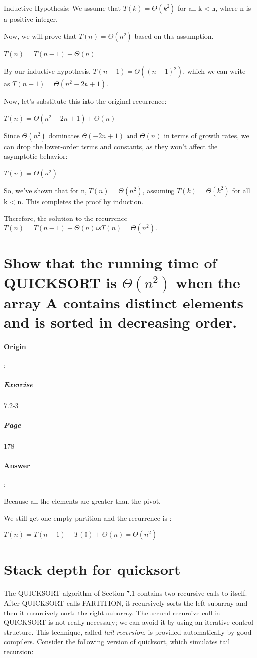 \documentclass{article}
\begin{document}
Inductive Hypothesis: We assume that $T(k) = \Theta(k^2)$ for all k < n, where n is a positive integer.

Now, we will prove that $T(n) = \Theta(n^2)$ based on this assumption.

$T(n) = T(n - 1) + \Theta(n)$

By our inductive hypothesis, $T(n - 1) = \Theta((n - 1)^2)$, which we can write as $T(n - 1) = \Theta(n^2 - 2n + 1)$.

Now, let's substitute this into the original recurrence:

$T(n) = \Theta(n^2 - 2n + 1) + \Theta(n)$

Since $\Theta(n^2)$ dominates $\Theta(-2n + 1)$ and $\Theta(n)$ in terms of growth rates, we can drop the lower-order terms and constants, as they won't affect the asymptotic behavior:

$T(n) = \Theta(n^2)$

So, we've shown that for n, $T(n) = \Theta(n^2)$, assuming $T(k) = \Theta(k^2)$ for all k < n. This completes the proof by induction.

Therefore, the solution to the recurrence $T(n) = T(n - 1) + \Theta(n) is T(n) = \Theta(n^2)$.

  \section{Show that the running time of QUICKSORT is $\Theta(n ^ 2)$ when the array A contains distinct elements and is sorted in decreasing order.}
  \paragraph{Origin}:
    \subparagraph{Exercise}7.2-3
    \subparagraph{Page}178
  \paragraph{Answer}:
  
  Because all the elements are greater than the pivot.

  We still get one empty partition and the recurrence is :

  $T(n) = T(n-1) + T(0) + \Theta(n)= \Theta(n^2)$

  \section{Stack depth for quicksort}

  The QUICKSORT algorithm of Section 7.1 contains two recursive calls to itself. After QUICKSORT calls PARTITION, it recursively sorts the left subarray and then it recursively sorts the right subarray. The second recursive call in QUICKSORT is not really necessary; we can avoid it by using an iterative control structure. This technique, called \textit{tail recursion}, is provided automatically by good compilers. Consider the following version of quicksort, which simulates tail recursion:
\end{document}
